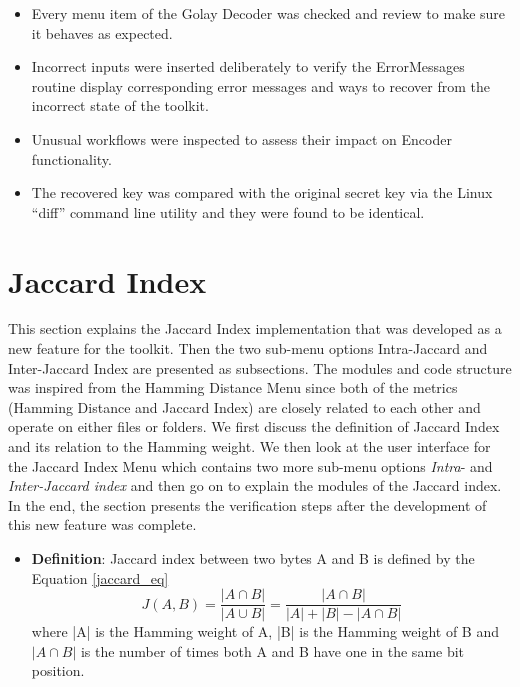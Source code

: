 	\begin{itemize}\itemsep-\the\parsep
		\item Every menu item of the Golay Decoder was checked and review to make sure it behaves as expected.
		\item Incorrect inputs were inserted deliberately to verify the ErrorMessages routine display corresponding error messages and ways to recover from the incorrect state of the toolkit.
		\item Unusual workflows were inspected to assess their impact on Encoder functionality.
		\item The recovered key was compared with the original secret key via the Linux ``diff'' command line utility and they were found to be identical.
	\end{itemize}

	\section{Jaccard Index}
	\label{jaccardi_index_section}
	This section explains the Jaccard Index implementation that was developed as a new feature for the toolkit. Then the two sub-menu options Intra-Jaccard and Inter-Jaccard Index are presented as subsections.
	The modules and code structure was inspired from the Hamming Distance Menu since both of the metrics (Hamming Distance and Jaccard Index) are closely related to each other and operate on either files or folders. We first discuss the definition of Jaccard Index and its relation to the Hamming weight. We then look at the user interface for the Jaccard Index Menu which contains two more sub-menu options \emph{Intra}- and \emph{Inter-Jaccard index} and then go on to explain the modules of the
	Jaccard index. In the end, the section presents the verification steps after the development of this new feature was complete.\\

	\begin{itemize}
		\item \textbf{Definition}: Jaccard index between two bytes A and B is defined by the Equation \ref{jaccard_eq}
		\begin{equation}
		J(A,B) = \frac {|A \cap B|} {|A\cup B|} = \frac{|A \cap B|} {|A| + |B| - |A \cap B|}
		\label{jaccard_eq}
		\end{equation}
		where |A| is the Hamming weight of A, |B| is the Hamming weight of B and $|A \cap B|$ is the number of times both A and B have one in the same bit position.
	\end{itemize}

